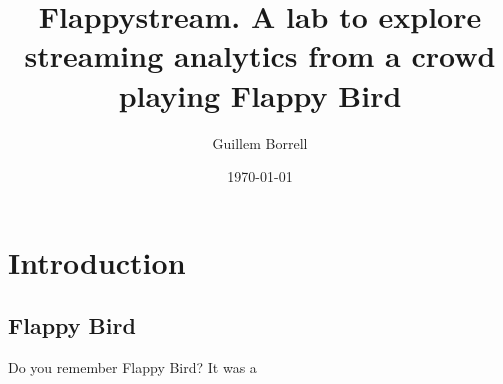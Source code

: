 \documentclass{article}
\begin{document}
\author{Guillem Borrell}
\title{Flappystream. A lab to explore streaming analytics from a crowd playing Flappy Bird}
\date{\today{}}
\maketitle{}
\tableofcontents{}

\section{Introduction}
\subsection{Flappy Bird}

Do you remember Flappy Bird? It was a 
\end{document}
